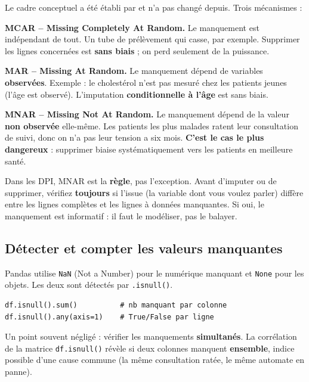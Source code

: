 \documentclass[11pt,a4paper]{article}
\begin{document}
Le cadre conceptuel a \'et\'e \'etabli par \citet{rubin1976inference} et
n'a pas chang\'e depuis. Trois m\'ecanismes :

\textbf{MCAR -- Missing Completely At Random.} Le manquement est
ind\'ependant de tout. Un tube de pr\'el\`evement qui casse, par exemple.
Supprimer les lignes concern\'ees est \textbf{sans biais} ; on perd
seulement de la puissance.

\textbf{MAR -- Missing At Random.} Le manquement d\'epend de variables
\textbf{observ\'ees}. Exemple : le cholest\'erol n'est pas mesur\'e chez
les patients jeunes (l'\^age est observ\'e). L'imputation
\textbf{conditionnelle \`a l'\^age} est sans biais.

\textbf{MNAR -- Missing Not At Random.} Le manquement d\'epend de la
valeur \textbf{non observ\'ee} elle-m\^eme. Les patients les plus malades
ratent leur consultation de suivi, donc on n'a pas leur tension a
six mois. \textbf{C'est le cas le plus dangereux} : supprimer biaise
syst\'ematiquement vers les patients en meilleure sant\'e.

\begin{attention}
Dans les DPI, MNAR est la \textbf{r\`egle}, pas l'exception. Avant
d'imputer ou de supprimer, v\'erifiez \textbf{toujours} si l'issue (la
variable dont vous voulez parler) diff\`ere entre les lignes compl\`etes
et les lignes \`a donn\'ees manquantes. Si oui, le manquement est
informatif : il faut le mod\'eliser, pas le balayer.
\end{attention}

\subsection{D\'etecter et compter les valeurs manquantes}

Pandas utilise \texttt{NaN} (Not a Number) pour le num\'erique manquant
et \texttt{None} pour les objets. Les deux sont d\'etect\'es par
\texttt{.isnull()}.

\begin{verbatim}
df.isnull().sum()          # nb manquant par colonne
df.isnull().any(axis=1)    # True/False par ligne
\end{verbatim}

Un point souvent n\'eglig\'e : v\'erifier les manquements
\textbf{simultan\'es}. La corr\'elation de la matrice
\texttt{df.isnull()} r\'ev\`ele si deux colonnes manquent
\textbf{ensemble}, indice possible d'une cause commune (la m\^eme
consultation rat\'ee, le m\^eme automate en panne).
\end{document}
